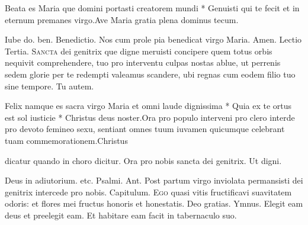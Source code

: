 \begin{multicols*}{2}
\begin{responsory}[beata-es]
{Beata es Maria que domini portasti creatorem mundi * Genuisti qui te fecit et in eternum premanes virgo.}{Ave Maria gratia plena dominus tecum.}
\end{responsory}
Iube do. ben. {\color{Red} Benedictio.} Nos cum prole pia benedicat virgo Maria. Amen. {\color{Red} Lectio Tertia.}
\lettrine[lines=2]{\zallmancaps \color{Blue} S}{ancta} dei genitrix que digne meruisti concipere quem totus orbis nequivit comprehendere, tuo pro interventu culpas nostas ablue, ut perrenis sedem glorie per te redempti valeamus scandere, ubi regnas cum eodem filio tuo sine tempore. Tu autem.
\begin{responsory-final}
{Felix namque es sacra virgo Maria et omni laude dignissima * Quia ex te ortus est sol iusticie * Christus deus noster.}{Ora pro populo interveni pro clero interde pro devoto femineo sexu, sentiant omnes tuum iuvamen quicumque celebrant tuam commemorationem.}{Christus}
\end{responsory-final}
 {\color{Red} dicatur quando in choro dicitur.} \V Ora pro nobis sancta dei genitrix. \R Ut digni.
{\color{Red} }
\par \noindent Deus in adiutorium. etc. {\color{Red} Psalmi.}
{\color{Red} Ant.} Post partum virgo inviolata permansisti dei genitrix intercede pro nobis. {\color{Red} Capitulum.}
\lettrine[lines=2]{\zallmancaps \color{Red} E}{go} quasi vitis fructificavi suavitatem odoris: et flores mei fructus honoris et honestatis. Deo gratias. {\color{Red} Ymnus.}
\newline \V Elegit eam deus et preelegit eam.
\newline \R Et habitare eam facit in tabernaculo suo.

\end{multicols*}
